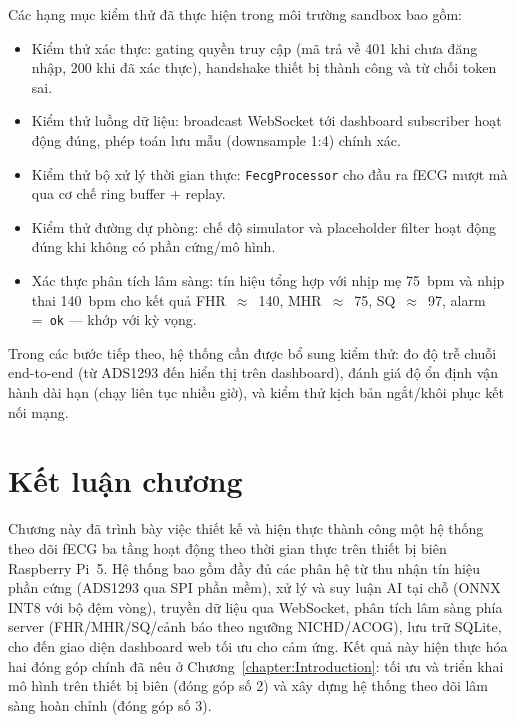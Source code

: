 \documentclass[../DoAn.tex]{subfiles}
\begin{document}
Các hạng mục kiểm thử đã thực hiện trong môi trường sandbox bao gồm:
\begin{itemize}
  \item Kiểm thử xác thực: gating quyền truy cập (mã trả về 401 khi chưa đăng nhập, 200 khi đã xác thực), handshake thiết bị thành công và từ chối token sai.
  \item Kiểm thử luồng dữ liệu: broadcast WebSocket tới dashboard subscriber hoạt động đúng, phép toán lưu mẫu (downsample 1:4) chính xác.
  \item Kiểm thử bộ xử lý thời gian thực: \texttt{FecgProcessor} cho đầu ra fECG mượt mà qua cơ chế ring buffer + replay.
  \item Kiểm thử đường dự phòng: chế độ simulator và placeholder filter hoạt động đúng khi không có phần cứng/mô hình.
  \item Xác thực phân tích lâm sàng: tín hiệu tổng hợp với nhịp mẹ 75~bpm và nhịp thai 140~bpm cho kết quả FHR~$\approx$~140, MHR~$\approx$~75, SQ~$\approx$~97, alarm =~\texttt{ok} --- khớp với kỳ vọng.
\end{itemize}

Trong các bước tiếp theo, hệ thống cần được bổ sung kiểm thử: đo độ trễ chuỗi end-to-end (từ ADS1293 đến hiển thị trên dashboard), đánh giá độ ổn định vận hành dài hạn (chạy liên tục nhiều giờ), và kiểm thử kịch bản ngắt/khôi phục kết nối mạng.

\section{Kết luận chương}

Chương này đã trình bày việc thiết kế và hiện thực thành công một hệ thống theo dõi fECG ba tầng hoạt động theo thời gian thực trên thiết bị biên Raspberry Pi~5. Hệ thống bao gồm đầy đủ các phân hệ từ thu nhận tín hiệu phần cứng (ADS1293 qua SPI phần mềm), xử lý và suy luận AI tại chỗ (ONNX INT8 với bộ đệm vòng), truyền dữ liệu qua WebSocket, phân tích lâm sàng phía server (FHR/MHR/SQ/cảnh báo theo ngưỡng NICHD/ACOG), lưu trữ SQLite, cho đến giao diện dashboard web tối ưu cho cảm ứng. Kết quả này hiện thực hóa hai đóng góp chính đã nêu ở Chương~\ref{chapter:Introduction}: tối ưu và triển khai mô hình trên thiết bị biên (đóng góp số 2) và xây dựng hệ thống theo dõi lâm sàng hoàn chỉnh (đóng góp số 3).
\end{document}
